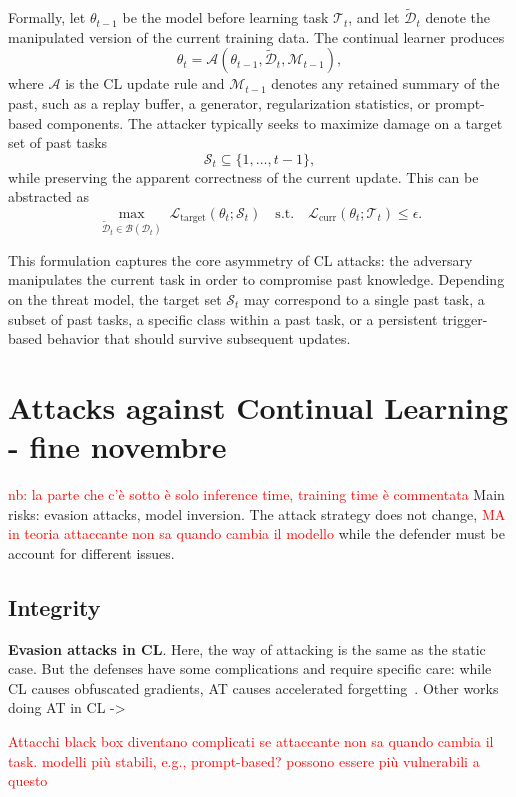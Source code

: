 \documentclass[5p,times]{elsarticle}
\newcommand{\mycomment}[1]{\textcolor{red}{#1}}
\newcommand{\myparagraph}[1]{\noindent \textbf{#1}.}
\begin{document}
Formally, let $\theta_{t-1}$ be the model before learning task $\mathcal{T}_t$, and let $\tilde{\mathcal{D}}_t$ denote the manipulated version of the current training data. The continual learner produces
\[
\theta_t = \mathcal{A}(\theta_{t-1}, \tilde{\mathcal{D}}_t, \mathcal{M}_{t-1}),
\]
where $\mathcal{A}$ is the CL update rule and $\mathcal{M}_{t-1}$ denotes any retained summary of the past, such as a replay buffer, a generator, regularization statistics, or prompt-based components. The attacker typically seeks to maximize damage on a target set of past tasks
\[
\mathcal{S}_t \subseteq \{1,\dots,t-1\},
\]
while preserving the apparent correctness of the current update. This can be abstracted as
\[
\max_{\tilde{\mathcal{D}}_t \in \mathcal{B}(\mathcal{D}_t)}
\; \mathcal{L}_{\text{target}}(\theta_t;\mathcal{S}_t)
\quad \text{s.t.} \quad
\mathcal{L}_{\text{curr}}(\theta_t;\mathcal{T}_t) \le \epsilon .
\]

This formulation captures the core asymmetry of CL attacks: the adversary manipulates the current task in order to compromise past knowledge. Depending on the threat model, the target set $\mathcal{S}_t$ may correspond to a single past task, a subset of past tasks, a specific class within a past task, or a persistent trigger-based behavior that should survive subsequent updates. 


\section{Attacks against Continual Learning - fine novembre}
\mycomment{nb: la parte che c'è sotto è solo inference time, training time è commentata}
Main risks: evasion attacks, model inversion.
The attack strategy does not change, 
\textcolor{red}{MA in teoria attaccante non sa quando cambia il modello}
while the defender must be account for different issues.

\subsection{Integrity}

\myparagraph{Evasion attacks in CL}
Here, the way of attacking is the same as the static case.
But the defenses have some complications and require specific care: while CL causes obfuscated gradients, AT causes accelerated forgetting~\cite{Mi-ICCV2025}.
Other works doing AT in CL -> \cite{Khan-IJCNN2022, Chen-TMLR2022, Bai-ICASSP2023}

\textcolor{red}{Attacchi black box diventano complicati se attaccante non sa quando cambia il task.
modelli più stabili, e.g., prompt-based? possono essere più vulnerabili a questo}
\end{document}
